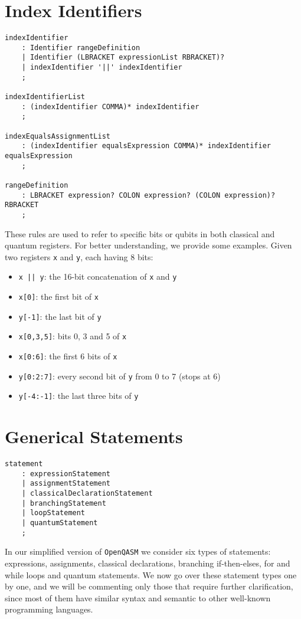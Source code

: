 \documentclass[12pt,a4paper]{report}
\theoremstyle{definition}
\theoremstyle{definition}
\theoremstyle{definition}
\begin{document}
\section{Index Identifiers}
\begin{lstlisting}
indexIdentifier
    : Identifier rangeDefinition
    | Identifier (LBRACKET expressionList RBRACKET)?
    | indexIdentifier '||' indexIdentifier
    ;

indexIdentifierList
    : (indexIdentifier COMMA)* indexIdentifier
    ;

indexEqualsAssignmentList
    : (indexIdentifier equalsExpression COMMA)* indexIdentifier equalsExpression
    ;

rangeDefinition
    : LBRACKET expression? COLON expression? (COLON expression)? RBRACKET
    ;
\end{lstlisting}
These rules are used to refer to specific bits or qubits in both classical and quantum registers. For better understanding, we provide some examples. Given two registers \texttt{x} and \texttt{y}, each having 8 bits:
\begin{itemize}
    \itemsep 0em
    \item \texttt{x || y}: the 16-bit concatenation of \texttt{x} and \texttt{y}
    \item \texttt{x[0]}: the first bit of \texttt{x}
    \item \texttt{y[-1]}: the last bit of \texttt{y}
    \item \texttt{x[0,3,5]}: bits 0, 3 and 5 of \texttt{x}
    \item \texttt{x[0:6]}: the first 6 bits of \texttt{x}
    \item \texttt{y[0:2:7]}: every second bit of \texttt{y} from 0 to 7 (stops at 6)
    \item \texttt{y[-4:-1]}: the last three bits of \texttt{y}
\end{itemize}

\section{Generical Statements}
\begin{lstlisting}
statement
    : expressionStatement
    | assignmentStatement
    | classicalDeclarationStatement
    | branchingStatement
    | loopStatement
    | quantumStatement
    ;
\end{lstlisting}

In our simplified version of \texttt{OpenQASM} we consider six types of statements: expressions, assignments, classical declarations, branching if-then-elses, for and while loops and quantum statements. We now go over these statement types one by one, and we will be commenting only those that require further clarification, since most of them have similar syntax and semantic to other well-known programming languages.\\
\end{document}
